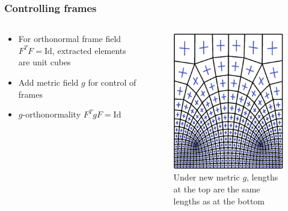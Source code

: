 \documentclass[
	11pt, %
	aspectratio=169, %
]{beamer}
\begin{document}
\begin{frame}
	\frametitle{Controlling frames}
	\begin{columns}[c] %
	
		\begin{column}{0.5\textwidth} %
			\begin{itemize}
				\item For orthonormal frame field $F^TF = \mathrm{Id}$, extracted elements are unit cubes
				\item Add metric field $g$ for control of frames
				\item $g$-orthonormality $F^TgF = \mathrm{Id}$
			\end{itemize}
		\end{column}
		\begin{column}{0.45\textwidth} %
			\begin{figure}
				\includegraphics[width=0.6\linewidth]{factorization.png}
				\caption{Under new metric $g$, lengths at the top are the same lengths as at the bottom \cite{fang}}
			\end{figure}
		\end{column}
	\end{columns}
\end{frame}

	
\end{document}
